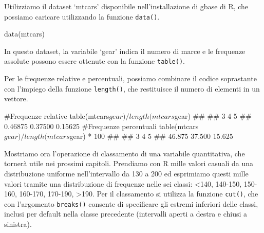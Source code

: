 \documentclass[a4paper,12pt,oneside]{book}
\newenvironment{Shaded}{\begin{snugshade}}{\end{snugshade}}
\newcommand{\DecValTok}[1]{#1}
\newcommand{\SpecialCharTok}[1]{#1}
\newcommand{\CommentTok}[1]{#1}
\newcommand{\DocumentationTok}[1]{#1}
\newcommand{\FunctionTok}[1]{#1}
\newcommand{\NormalTok}[1]{#1}
\begin{document}
Utilizziamo il dataset `mtcars' disponibile nell'installazione di gbase di R, che possiamo caricare utilizzando la funzione \texttt{data()}.

\begin{Shaded}
\begin{Highlighting}[]
\FunctionTok{data}\NormalTok{(mtcars)}
\end{Highlighting}
\end{Shaded}

In questo dataset, la variabile `gear' indica il numero di marce e le frequenze assolute possono essere ottenute con la funzione \texttt{table()}.

\begin{Shaded}
\end{Shaded}

Per le frequenze relative e percentuali, possiamo combinare il codice soprastante con l'impiego della funzione \texttt{length()}, che restituisce il numero di elementi in un vettore.

\begin{Shaded}
\begin{Highlighting}[]
\CommentTok{\#Frequenze relative}
\FunctionTok{table}\NormalTok{(mtcars}\SpecialCharTok{$}\NormalTok{gear)}\SpecialCharTok{/}\FunctionTok{length}\NormalTok{(mtcars}\SpecialCharTok{$}\NormalTok{gear)}
\DocumentationTok{\#\# }
\DocumentationTok{\#\#       3       4       5 }
\DocumentationTok{\#\# 0.46875 0.37500 0.15625}
\CommentTok{\#Frequenze percentuali}
\FunctionTok{table}\NormalTok{(mtcars}\SpecialCharTok{$}\NormalTok{gear)}\SpecialCharTok{/}\FunctionTok{length}\NormalTok{(mtcars}\SpecialCharTok{$}\NormalTok{gear) }\SpecialCharTok{*} \DecValTok{100}
\DocumentationTok{\#\# }
\DocumentationTok{\#\#      3      4      5 }
\DocumentationTok{\#\# 46.875 37.500 15.625}
\end{Highlighting}
\end{Shaded}

Mostriamo ora l'operazione di classamento di una variabile quantitativa, che tornerà utile nei prossimi capitoli. Prendiamo con R mille valori casuali da una distribuzione uniforme nell'intervallo da 130 a 200 ed esprimiamo questi mille valori tramite una distribuzione di frequenze nelle sei classi: \textless140, 140-150, 150-160, 160-170, 170-190, \textgreater190. Per il classamento si utilizza la funzione \texttt{cut()}, che con l'argomento \texttt{breaks()} consente di specificare gli estremi inferiori delle classi, inclusi per default nella classe precedente (intervalli aperti a destra e chiusi a sinistra).
\end{document}
